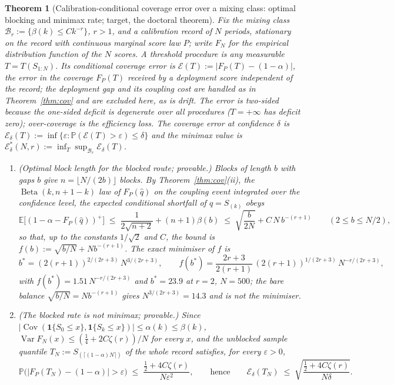 \documentclass[11pt,a4paper]{article}
\newcommand{\target}{{\color{teal}\textsf{\small target}}}
\theoremstyle{plain}
\newtheorem{theorem}{Theorem}
\theoremstyle{definition}
\theoremstyle{remark}
\newcommand{\E}{\mathbb{E}}
\newcommand{\Prob}{\mathbb{P}}
\DeclareMathOperator{\Cov}{Cov}
\DeclareMathOperator{\Beta}{Beta}
\begin{document}
\begin{theorem}[Calibration-conditional coverage error over a mixing class: optimal blocking and minimax rate; \target, the doctoral theorem]\label{thm:block}
Fix the mixing class $\mathcal B_r:=\{\beta(k)\le Ck^{-r}\}$, $r>1$, and a calibration record of $N$ periods, stationary on the record with continuous marginal score law $P$; write $F_N$ for the empirical distribution function of the $N$ scores. A \emph{threshold procedure} is any measurable $T=T(S_{1:N})$. Its \emph{conditional coverage error} is $\mathcal E(T):=|F_P(T)-(1-\alpha)|$, the error in the coverage $F_P(T)$ received by a deployment score independent of the record; the deployment gap and its coupling cost are handled as in Theorem~\ref{thm:cov} and are excluded here, as is drift. The error is two-sided because the one-sided deficit is degenerate over all procedures ($T=+\infty$ has deficit zero); over-coverage is the efficiency loss. The \emph{coverage error at confidence $\delta$} is $\mathcal E_\delta(T):=\inf\{\varepsilon:\Prob(\mathcal E(T)>\varepsilon)\le\delta\}$ and the minimax value is $\mathcal E^*_\delta(N,r):=\inf_T\sup_{\mathcal B_r}\mathcal E_\delta(T)$.
\begin{enumerate}[nosep,label=(\roman*)]
\item (Optimal block length for the blocked route; provable.) Blocks of length $b$ with gaps $b$ give $n=\lfloor N/(2b)\rfloor$ blocks. By Theorem~\ref{thm:cov}(ii), the $\Beta(k,n+1-k)$ law of $F_P(\hat q)$ on the coupling event integrated over the confidence level, the expected conditional shortfall of $\hat q=S_{(k)}$ obeys
\[
\E\big[(1-\alpha-F_P(\hat q))^+\big]\;\le\;\frac{1}{2\sqrt{n+2}}+(n+1)\beta(b)\;\le\;\sqrt{\frac{b}{2N}}+C\,N\,b^{-(r+1)}\qquad(2\le b\le N/2),
\]
so that, up to the constants $1/\sqrt2$ and $C$, the bound is $f(b):=\sqrt{b/N}+Nb^{-(r+1)}$. The exact minimiser of $f$ is
\[
b^*=(2(r+1))^{2/(2r+3)}\,N^{3/(2r+3)},\qquad f(b^*)=\frac{2r+3}{2(r+1)}\,(2(r+1))^{1/(2r+3)}\,N^{-r/(2r+3)},
\]
with $f(b^*)=1.51\,N^{-r/(2r+3)}$ and $b^*=23.9$ at $r=2$, $N=500$; the bare balance $\sqrt{b/N}=Nb^{-(r+1)}$ gives $N^{3/(2r+3)}=14.3$ and is not the minimiser.
\item (The blocked rate is not minimax; provable.) Since $|\Cov(\mathbf 1\{S_0\le x\},\mathbf 1\{S_k\le x\})|\le\alpha(k)\le\beta(k)$, $\operatorname{Var}F_N(x)\le(\tfrac14+2C\zeta(r))/N$ for every $x$, and the unblocked sample quantile $T_N:=S_{(\lceil(1-\alpha)N\rceil)}$ of the whole record satisfies, for every $\varepsilon>0$,
\[
\Prob\big(|F_P(T_N)-(1-\alpha)|>\varepsilon\big)\;\le\;\frac{\tfrac12+4C\zeta(r)}{N\varepsilon^{2}},\qquad\text{hence}\qquad \mathcal E_\delta(T_N)\;\le\;\sqrt{\frac{\tfrac12+4C\zeta(r)}{N\delta}} .
\]
\end{enumerate}
\end{theorem}
\end{document}
